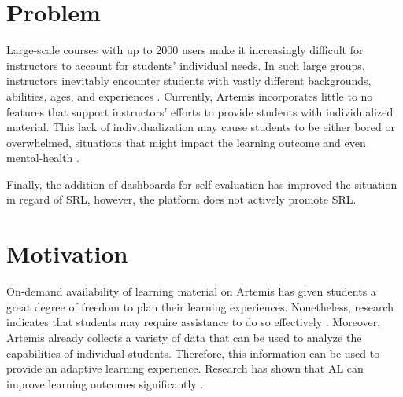 \documentclass[a4paper,12pt,twoside]{article}
\begin{document}
\section{Problem}

Large-scale courses with up to 2000 users make it increasingly difficult for instructors to account for students' individual needs. In such large groups,
instructors inevitably encounter students with vastly different backgrounds, abilities, ages, and experiences \cite{mulryan2010teaching}. Currently, Artemis
incorporates little to no features that support instructors' efforts to provide students with individualized material. This lack of individualization
may cause students to be either bored or overwhelmed, situations that might impact the learning outcome and even mental-health \cite{graciani2020m, kadison2004college}.

Finally, the addition of dashboards for self-evaluation has improved the situation in regard of \ac{SRL}, however, the platform does not actively promote
\ac{SRL}.


\section{Motivation}

On-demand availability of learning material on Artemis has given students a great degree of freedom to plan their learning experiences. Nonetheless, research
indicates that students may require assistance to do so effectively \cite{latham1991self}. Moreover, Artemis already collects a variety of data that can be used to analyze
the capabilities of individual students. Therefore, this information can be used to provide an adaptive learning experience. Research has shown that
\ac{AL} can improve learning outcomes significantly \cite{liu2017investigating}.
\end{document}
